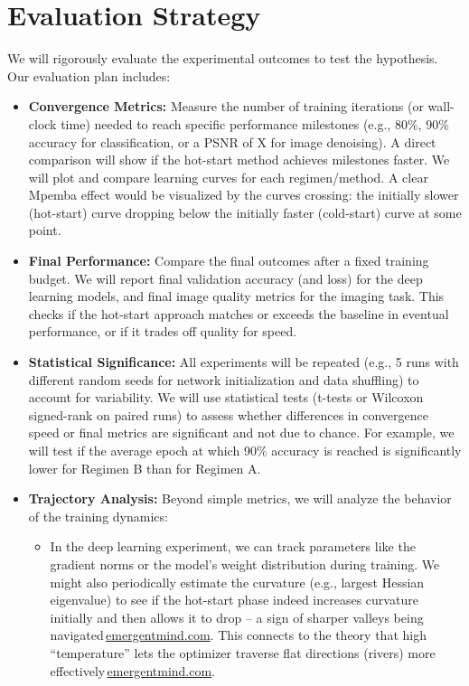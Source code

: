 \documentclass[11pt]{article}
\begin{document}
\section{Evaluation Strategy}

We will rigorously evaluate the experimental outcomes to test the hypothesis. Our evaluation plan includes:

\begin{itemize}
  \item \textbf{Convergence Metrics:} Measure the number of training iterations (or wall-clock time) needed to reach specific performance milestones (e.g., 80\%, 90\% accuracy for classification, or a PSNR of X for image denoising). A direct comparison will show if the hot-start method achieves milestones faster. We will plot and compare learning curves for each regimen/method. A clear Mpemba effect would be visualized by the curves crossing: the initially slower (hot-start) curve dropping below the initially faster (cold-start) curve at some point.
  \item \textbf{Final Performance:} Compare the final outcomes after a fixed training budget. We will report final validation accuracy (and loss) for the deep learning models, and final image quality metrics for the imaging task. This checks if the hot-start approach matches or exceeds the baseline in eventual performance, or if it trades off quality for speed.
  \item \textbf{Statistical Significance:} All experiments will be repeated (e.g., 5 runs with different random seeds for network initialization and data shuffling) to account for variability. We will use statistical tests (t-tests or Wilcoxon signed-rank on paired runs) to assess whether differences in convergence speed or final metrics are significant and not due to chance. For example, we will test if the average epoch at which 90\% accuracy is reached is significantly lower for Regimen B than for Regimen A.
  \item \textbf{Trajectory Analysis:} Beyond simple metrics, we will analyze the behavior of the training dynamics:
    \begin{itemize}
      \item In the deep learning experiment, we can track parameters like the gradient norms or the model's weight distribution during training. We might also periodically estimate the curvature (e.g., largest Hessian eigenvalue) to see if the hot-start phase indeed increases curvature initially and then allows it to drop -- a sign of sharper valleys being navigated\,\href{https://www.emergentmind.com/topics/warmup-stable-decay-wsd-schedules#:~:text=,updates%2C mitigates the effect of}{emergentmind.com}. This connects to the theory that high ``temperature'' lets the optimizer traverse flat directions (rivers) more effectively\,\href{https://www.emergentmind.com/topics/warmup-stable-decay-wsd-schedules#:~:text=,tuning%2C” reducing}{emergentmind.com}.

\end{itemize}
\end{itemize}
\end{document}
